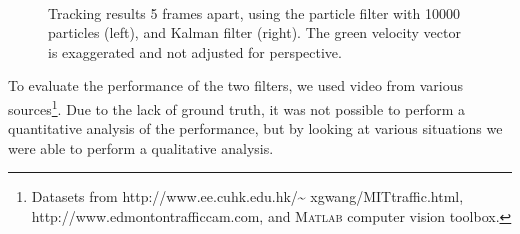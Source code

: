 \documentclass[conference]{IEEEtran}
\begin{document}
\begin{figure}
  \centering
  \\
  \caption{Tracking results 5 frames apart, using the particle filter with 10000
    particles (left), and Kalman filter (right). The green velocity vector is
    exaggerated and not adjusted for perspective.}
  \label{fig:viptraf}
\end{figure}

To evaluate the performance of the two filters, we used video from various
sources\footnote{Datasets from http://www.ee.cuhk.edu.hk/\textasciitilde
  xgwang/MITtraffic.html, http://www.edmontontrafficcam.com, and \textsc{Matlab}
  computer vision toolbox.}. Due to the lack of ground truth, it was not
possible to perform a quantitative analysis of the performance, but by looking
at various situations we were able to perform a qualitative analysis.
\end{document}
